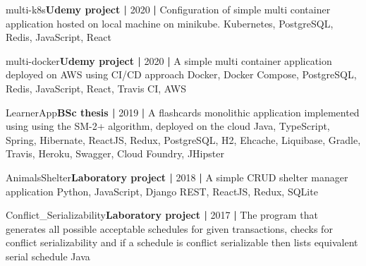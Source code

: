 \begin{projects}

	\project
	{multi-k8s}{\textbf{Udemy project |} 2020 \textbf{|}}
	{}
	{Configuration of simple multi container application hosted on local machine on minikube.}
	{Kubernetes, PostgreSQL, Redis, JavaScript, React}
	
	\project
	{multi-docker}{\textbf{Udemy project |} 2020 \textbf{|}}
	{}
	{A simple multi container application deployed on AWS using CI/CD approach }
	{Docker, Docker Compose, PostgreSQL, Redis, JavaScript, React, Travis CI, AWS}

	\project
	{LearnerApp}{\textbf{BSc thesis |} 2019 \textbf{|}}
	{}
	{A flashcards monolithic application implemented using using the SM-2+ algorithm, deployed on the cloud}
	{Java, TypeScript, Spring, Hibernate, ReactJS, Redux, PostgreSQL, H2, Ehcache, Liquibase, Gradle, Travis, Heroku, Swagger, Cloud Foundry, JHipster}	
	
\end{projects}
\begin{projects}

	\project
	{AnimalsShelter}{\textbf{Laboratory project |} 2018 \textbf{|}}
	{}
	{A simple CRUD shelter manager application}
	{Python, JavaScript, Django REST, ReactJS, Redux, SQLite}
	
	\project
	{Conflict\_Serializability}{\textbf{Laboratory project |} 2017 \textbf{|}}
	{}
	{The program that generates all possible acceptable schedules for given transactions, checks for conflict serializability and if a schedule is conflict serializable then lists equivalent serial schedule}
	{Java}
\end{projects}